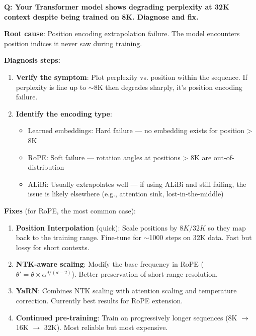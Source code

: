 \begin{interviewq}
\textbf{Q: Your Transformer model shows degrading perplexity at 32K context despite being trained on 8K. Diagnose and fix.}

 \quad {} \quad \badgefreq{\freqmed}

\stronganswer

\textbf{Root cause}: Position encoding extrapolation failure. The model encounters position indices it never saw during training.

\textbf{Diagnosis steps:}
\begin{enumerate}
    \item \textbf{Verify the symptom}: Plot perplexity vs. position within the sequence. If perplexity is fine up to $\sim$8K then degrades sharply, it's position encoding failure.
    \item \textbf{Identify the encoding type}:
    \begin{itemize}
        \item Learned embeddings: Hard failure --- no embedding exists for position > 8K
        \item RoPE: Soft failure --- rotation angles at positions > 8K are out-of-distribution
        \item ALiBi: Usually extrapolates well --- if using ALiBi and still failing, the issue is likely elsewhere (e.g., attention sink, lost-in-the-middle)
    \end{itemize}
\end{enumerate}

\textbf{Fixes} (for RoPE, the most common case):
\begin{enumerate}
    \item \textbf{Position Interpolation} (quick): Scale positions by $8K/32K$ so they map back to the training range. Fine-tune for $\sim$1000 steps on 32K data. Fast but lossy for short contexts.
    \item \textbf{NTK-aware scaling}: Modify the base frequency in RoPE ($\theta' = \theta \times \alpha^{d/(d-2)}$). Better preservation of short-range resolution.
    \item \textbf{YaRN}: Combines NTK scaling with attention scaling and temperature correction. Currently best results for RoPE extension.
    \item \textbf{Continued pre-training}: Train on progressively longer sequences (8K $\to$ 16K $\to$ 32K). Most reliable but most expensive.
\end{enumerate}


\end{interviewq}
